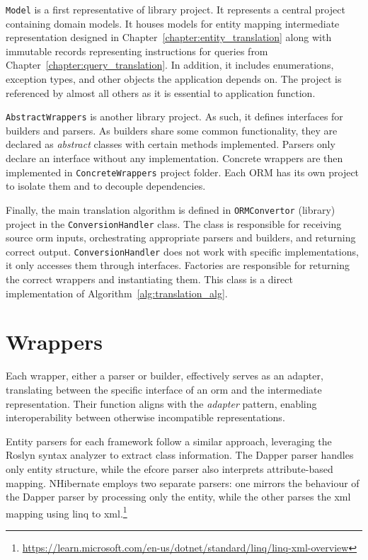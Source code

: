 \texttt{Model} is a first representative of library project. It represents a central project containing domain models. It houses models for entity mapping intermediate representation designed in Chapter~\ref{chapter:entity_translation} along with immutable records representing instructions for queries from Chapter~\ref{chapter:query_translation}. In addition, it includes enumerations, exception types, and other objects the application depends on. The project is referenced by almost all others as it is essential to application function.

\texttt{AbstractWrappers} is another library project. As such, it defines interfaces for builders and parsers. As builders share some common functionality, they are declared as \textit{abstract} classes with certain methods implemented. Parsers only declare an interface without any implementation. Concrete wrappers are then implemented in \texttt{ConcreteWrappers} project folder. Each ORM has its own project to isolate them and to decouple dependencies.

Finally, the main translation algorithm is defined in \texttt{ORMConvertor} (library) project in the \texttt{ConversionHandler} class. The class is responsible for receiving source \acrshort{orm} inputs, orchestrating appropriate parsers and builders, and returning correct output. \texttt{ConversionHandler} does not work with specific implementations, it only accesses them through interfaces. Factories are responsible for returning the correct wrappers and instantiating them. This class is a direct implementation of Algorithm~\ref{alg:translation_alg}.

\section{Wrappers}
Each wrapper, either a parser or builder, effectively serves as an adapter, translating between the specific interface of an \acrshort{orm} and the intermediate representation. Their function aligns with the \textit{adapter} pattern, enabling interoperability between otherwise incompatible representations.

Entity parsers for each framework follow a similar approach, leveraging the Roslyn syntax analyzer to extract class information. The Dapper parser handles only entity structure, while the \acrshort{efcore} parser also interprets attribute-based mapping. NHibernate employs two separate parsers: one mirrors the behaviour of the Dapper parser by processing only the entity, while the other parses the \acrshort{xml} mapping using \acrshort{linq} to \acrshort{xml}.\footnote{\url{https://learn.microsoft.com/en-us/dotnet/standard/linq/linq-xml-overview}}

